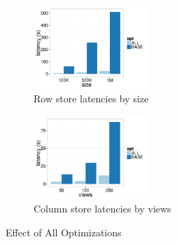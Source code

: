 

\begin{figure}[h]
	\centering
	\begin{subfigure}{0.48\linewidth}
		\centering
		\includegraphics[width=4.4cm] {Images/row_all_none_by_size.pdf}
		\caption{Row store latencies by size}
		\label{fig:row_all_none_size}
	\end{subfigure}
	\begin{subfigure}{0.48\linewidth}
		\centering
		\includegraphics[width=4.4cm] {Images/col_all_none_by_views.pdf}
		\caption{Column store latencies by views}
		\label{fig:col_all_none_views}
	\end{subfigure}
	\vspace{-10pt}
	\caption{Effect of All Optimizations}
	\label{fig:all_opt}
	\vspace{-15pt}
\end{figure}


